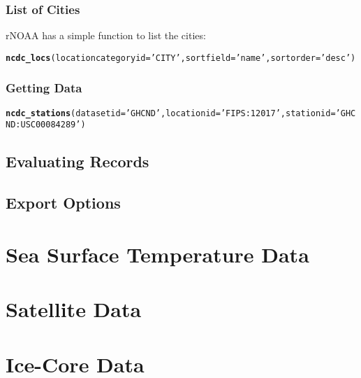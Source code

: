 \documentclass{article}\usepackage[]{graphicx}\usepackage[]{color}
\makeatletter
\newcommand{\hlstr}[1]{\textcolor[rgb]{0.192,0.494,0.8}{#1}}%
\newcommand{\hlstd}[1]{\textcolor[rgb]{0.345,0.345,0.345}{#1}}%
\newcommand{\hlkwc}[1]{\textcolor[rgb]{0.333,0.667,0.333}{#1}}%
\newcommand{\hlkwd}[1]{\textcolor[rgb]{0.737,0.353,0.396}{\textbf{#1}}}%
\newenvironment{kframe}{%
 \def\at@end@of@kframe{}%
 \ifinner\ifhmode%
  \def\at@end@of@kframe{\end{minipage}}%
  \begin{minipage}{\columnwidth}%
 \fi\fi%
 \def\FrameCommand##1{\hskip\@totalleftmargin \hskip-\fboxsep
 \colorbox{shadecolor}{##1}\hskip-\fboxsep
     \hskip-\linewidth \hskip-\@totalleftmargin \hskip\columnwidth}%
 \MakeFramed {\advance\hsize-\width
   \@totalleftmargin\z@ \linewidth\hsize
   \@setminipage}}%
 {\par\unskip\endMakeFramed%
 \at@end@of@kframe}
\newenvironment{knitrout}{}{} %
\makeatother
\begin{document}
\subsubsection{List of Cities}

rNOAA has a simple function to list the cities:
\begin{knitrout}
\color{fgcolor}\begin{kframe}
\begin{alltt}
\hlkwd{ncdc_locs}\hlstd{(}\hlkwc{locationcategoryid}\hlstd{=}\hlstr{'CITY'}\hlstd{,} \hlkwc{sortfield}\hlstd{=}\hlstr{'name'}\hlstd{,} \hlkwc{sortorder}\hlstd{=}\hlstr{'desc'}\hlstd{)}
\end{alltt}


{\ttfamily\noindent\bfseries{}}\end{kframe}
\end{knitrout}

\subsubsection{Getting Data}
\begin{knitrout}
\color{fgcolor}\begin{kframe}
\begin{alltt}
\hlkwd{ncdc_stations}\hlstd{(}\hlkwc{datasetid}\hlstd{=}\hlstr{'GHCND'}\hlstd{,} \hlkwc{locationid}\hlstd{=}\hlstr{'FIPS:12017'}\hlstd{,} \hlkwc{stationid}\hlstd{=}\hlstr{'GHCND:USC00084289'}\hlstd{)}
\end{alltt}


{\ttfamily\noindent\bfseries{}}\end{kframe}
\end{knitrout}

\subsection{Evaluating Records}

\subsection{Export Options}

\section{Sea Surface Temperature Data}

\section{Satellite Data}

\section{Ice-Core Data}
\end{document}
